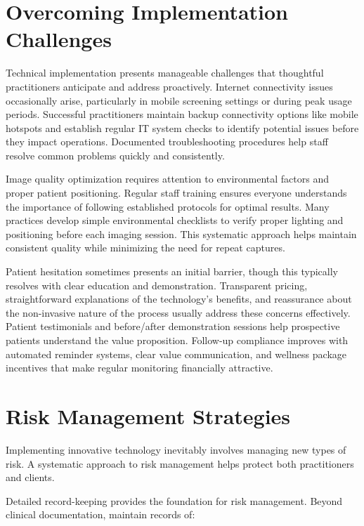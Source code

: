 \documentclass[
  Letterpaper,
]{scrbook}
\begin{document}
\section{Overcoming Implementation
Challenges}\label{overcoming-implementation-challenges}

Technical implementation presents manageable challenges that thoughtful
practitioners anticipate and address proactively. Internet connectivity
issues occasionally arise, particularly in mobile screening settings or
during peak usage periods. Successful practitioners maintain backup
connectivity options like mobile hotspots and establish regular IT
system checks to identify potential issues before they impact
operations. Documented troubleshooting procedures help staff resolve
common problems quickly and consistently.

Image quality optimization requires attention to environmental factors
and proper patient positioning. Regular staff training ensures everyone
understands the importance of following established protocols for
optimal results. Many practices develop simple environmental checklists
to verify proper lighting and positioning before each imaging session.
This systematic approach helps maintain consistent quality while
minimizing the need for repeat captures.

Patient hesitation sometimes presents an initial barrier, though this
typically resolves with clear education and demonstration. Transparent
pricing, straightforward explanations of the technology's benefits, and
reassurance about the non-invasive nature of the process usually address
these concerns effectively. Patient testimonials and before/after
demonstration sessions help prospective patients understand the value
proposition. Follow-up compliance improves with automated reminder
systems, clear value communication, and wellness package incentives that
make regular monitoring financially attractive.

\section{Risk Management Strategies}\label{risk-management-strategies}

Implementing innovative technology inevitably involves managing new
types of risk. A systematic approach to risk management helps protect
both practitioners and clients.

Detailed record-keeping provides the foundation for risk management.
Beyond clinical documentation, maintain records of:
\end{document}
